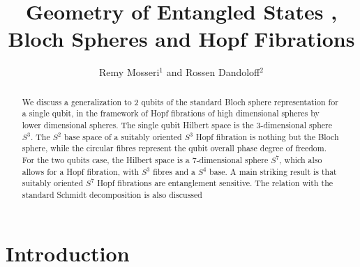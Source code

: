 \documentclass{amsart}
\begin{document}
\title{Geometry of Entangled States , Bloch Spheres and Hopf Fibrations }
\author{Remy Mosseri$^{1}$ and Rossen Dandoloff$^{2}$}
\address{$^{1}$ Groupe de Physique des Solides, CNRS UMR 7588,\\
Universit\'{e}s Pierre et Marie Curie Paris 6 et Denis Diderot Paris 7,\\
2 place Jussieu, 75251 Paris Cedex 05 France\\
$^{2}$Laboratoire de physique theorique et modelisation, (CNRS-ESA 8089 ),
Universite de Cergy-Pontoise\\
Site de Neuville 3, 5 Mail Gay-Lussac, F-95031 Cergy-Pontoise Cedex}
\maketitle
\begin{abstract}We discuss a generalization to 2 qubits of the standard Bloch sphere
representation for a single qubit, in the framework of Hopf fibrations of high
dimensional spheres by lower dimensional spheres. The single qubit Hilbert
space is the 3-dimensional sphere $S^{3}$. The $S^{2}$ base space of a
suitably oriented $S^{3}$ Hopf fibration is nothing but the Bloch sphere,
while the circular fibres represent the qubit overall phase degree of freedom.
For the two qubits case, the Hilbert space is a 7-dimensional sphere $S^{7}$,
which also allows for a Hopf fibration, with $S^{3}$ fibres and a $S^{4}$
base. A main striking result is that suitably oriented $S^{7}$ Hopf fibrations
are entanglement sensitive. The relation with the standard Schmidt
decomposition is also discussed
\end{abstract}


\section{ Introduction}
\end{document}
